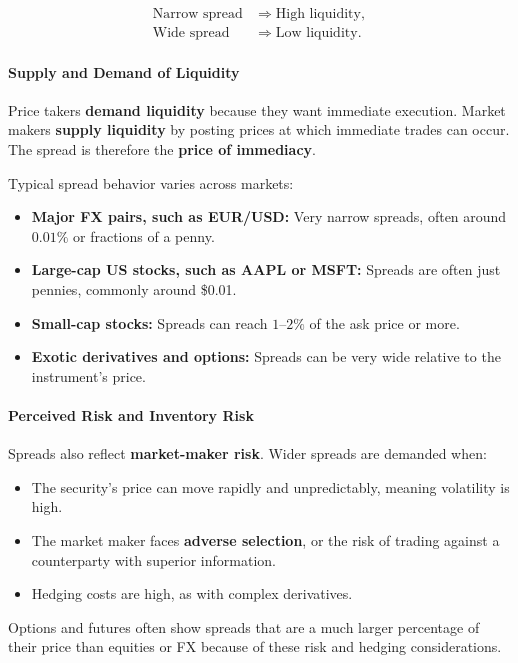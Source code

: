 \documentclass[12pt,openany]{book}
\begin{document}
\begin{align*}
    \text{Narrow spread} &\Rightarrow \text{High liquidity}, \\
    \text{Wide spread} &\Rightarrow \text{Low liquidity}.
\end{align*}

\paragraph{Supply and Demand of Liquidity}
Price takers \textbf{demand liquidity} because they want immediate execution. Market makers \textbf{supply liquidity} by posting prices at which immediate trades can occur. The spread is therefore the \textbf{price of immediacy}.

Typical spread behavior varies across markets:

\begin{itemize}[leftmargin=*]
    \item \textbf{Major FX pairs, such as EUR/USD:} Very narrow spreads, often around $0.01\%$ or fractions of a penny.
    \item \textbf{Large-cap US stocks, such as AAPL or MSFT:} Spreads are often just pennies, commonly around \$0.01.
    \item \textbf{Small-cap stocks:} Spreads can reach $1$--$2\%$ of the ask price or more.
    \item \textbf{Exotic derivatives and options:} Spreads can be very wide relative to the instrument's price.
\end{itemize}

\paragraph{Perceived Risk and Inventory Risk}
Spreads also reflect \textbf{market-maker risk}. Wider spreads are demanded when:

\begin{itemize}[leftmargin=*]
    \item The security's price can move rapidly and unpredictably, meaning volatility is high.
    \item The market maker faces \textbf{adverse selection}, or the risk of trading against a counterparty with superior information.
    \item Hedging costs are high, as with complex derivatives.
\end{itemize}

Options and futures often show spreads that are a much larger percentage of their price than equities or FX because of these risk and hedging considerations.
\end{document}
